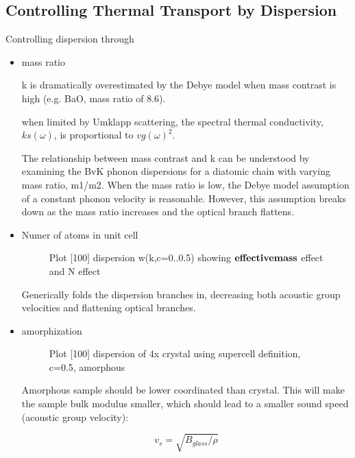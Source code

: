\documentclass[letterpaper,12pt]{article}
\begin{document}
\subsection{\label{S-Intro-Dispersion_Disordered}Controlling Thermal Transport by Dispersion}

Controlling dispersion through 

\begin{itemize}

\item mass ratio

k is dramatically overestimated
by the Debye model when mass
contrast is high (e.g. BaO, mass ratio
of 8.6).\cite{Toberer2011}

when limited by Umklapp scattering, the
spectral thermal conductivity, $ks(\omega)$, is
proportional to $vg(\omega)^2$.

The relationship between mass contrast and k can be understood by examining
the BvK phonon dispersions for a diatomic chain with varying mass ratio,
m1/m2. When the mass ratio is low, the Debye model assumption of
a constant phonon velocity is reasonable. However, this assumption breaks down as the mass ratio increases and the optical branch flattens.  \cite{PhysRev.141.767} 

\item Numer of atoms in unit cell

\begin{figure}\begin{center}
\caption{\label{F:PEAK_COMPARE} Plot [100] dispersion w(k,c=0..0.5) showing $\bf{effective mass}$ effect and N effect}
\end{center}\end{figure}

Generically folds the dispersion branches in, decreasing both acoustic group velocities and flattening optical branches.

\item amorphization

\begin{figure}\begin{center}
\caption{\label{F:PEAK_COMPARE} Plot [100] dispersion of 4x crystal using supercell definition, c=0.5, amorphous}
\end{center}\end{figure}

Amorphous sample should be lower coordinated than crystal.  This will make the sample bulk modulus smaller, which should lead to a smaller sound speed (acoustic group velocity):

\begin{equation}\label{E-Seq}
v_s = \sqrt{B_{glass}/\rho}
\end{equation}

\end{itemize}
\end{document}
